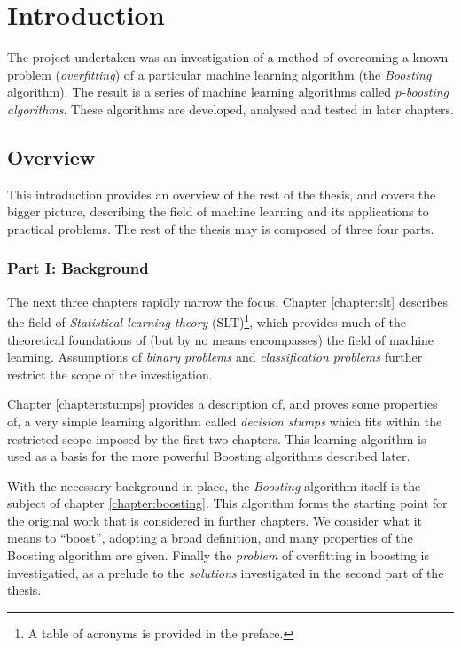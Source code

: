 
\chapter{Introduction}
\label{chapter:intro}

The project undertaken was an investigation of a method of
overcoming a known problem (\emph{overfitting}) of a particular
machine learning algorithm (the \emph{Boosting} algorithm).  The
result is a series of machine learning algorithms called
\emph{$p$-boosting algorithms}.  These algorithms are developed,
analysed and tested in later chapters.


\section{Overview}

This introduction provides an overview of the rest of the thesis, and
covers the bigger picture, describing the field of machine learning
and its applications to practical problems.  The rest of the thesis
may is composed of three four parts.

\subsection*{Part I: Background}

The next three chapters rapidly narrow the focus.  Chapter
\ref{chapter:slt} describes the field of \emph{Statistical learning
theory} (SLT)\footnote{A table of acronyms is provided in the
preface.}, which provides much of the theoretical
foundations of (but by no means encompasses) the field of machine
learning.  Assumptions of \emph{binary problems} and
\emph{classification problems} further restrict the scope of the
investigation.

Chapter \ref{chapter:stumps} provides a description of, and proves
some properties of, a very simple learning algorithm called
\emph{decision stumps} which fits within the restricted scope imposed
by the first two chapters.  This learning algorithm
is used as a basis for the more powerful Boosting algorithms described
later.

With the necessary background in place, the \emph{Boosting} algorithm
itself is the subject of chapter \ref{chapter:boosting}.  This
algorithm forms the starting point for the original work that is
considered in further chapters.  We consider what it means to
``boost'', adopting a broad definition, and many properties of the
Boosting algorithm are given.  Finally the \emph{problem} of overfitting in
boosting is investigatied, as a prelude to the \emph{solutions}
investigated in the second part of the thesis.


